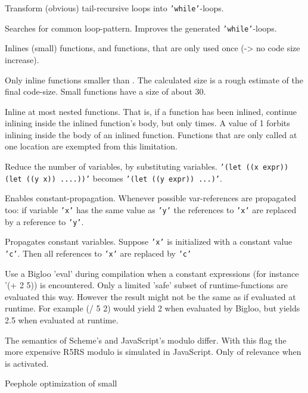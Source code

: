\begin{Description}
\item[\Opt{--tailrec}] Transform (obvious) tail-recursive loops into
\texttt{'while'}-loops.
\item[\Opt{--while}] Searches for common loop-pattern. Improves the generated
			      \texttt{'while'}-loops.
\item[\Opt{--inlining}] Inlines (small) functions, and functions, that are only
used once (-> no code size increase).
\item[\OptArg{--max-inline-size}{ size}] Only inline functions smaller
than . The calculated size is a rough estimate of the final
code-size. Small functions have a size of about 30.
\item[\OptArg{--rec-inline-nb}{ nb}] Inline at most  nested
functions. That is, if a function has been inlined, continue inlining inside
the inlined function's body, but only  times. A value of 1 forbits
inlining inside the body of an inlined function. Functions that are only called
at one location are exempted from this limitation.
\item[\Opt{--var-elimination}] Reduce the number of variables, by substituting
variables. \texttt{'(let ((x expr)) (let ((y x)) ....))'} becomes
\texttt{'(let ((y expr)) ...)'}.
\item[\Opt{--propagation}] Enables constant-propagation. Whenever possible
var-references are propagated too: if variable \texttt{'x'} has the same value as
\texttt{'y'} the references to \texttt{'x'} are replaced by a reference to
\texttt{'y'}.
\item[\Opt{--constant-propagation}] Propagates constant variables. Suppose
\texttt{'x'} is initialized with a constant value \texttt{'c'}. Then all references
to \texttt{'x'} are replaced by \texttt{'c'}
\item[\Opt{--bigloo-runtime-eval}] Use a Bigloo 'eval' during compilation when
a constant expressions (for instance '(+ 2 5)) is encountered. Only a limited
'safe' subset of runtime-functions are evaluated this way. However the result
might not be the same as if evaluated at runtime. For example (/ 5 2) would
yield 2 when evaluated by Bigloo, but yields 2.5 when evaluated at runtime.
\item[\Opt{--correct-modulo}] The semantics of Scheme's and JavaScript's modulo
differ. With this flag the more expensive R5RS modulo is simulated in
JavaScript. Only of relevance when   is activated.
\item[\Opt{--optimize-calls}] Peephole optimization of small

\end{Description}
